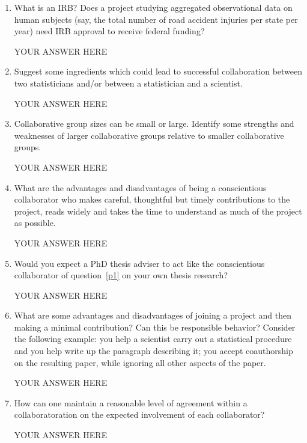 \documentclass[12pt]{article}
\begin{document}
\begin{enumerate}

\item What is an IRB? Does a project studying aggregated observational data on human subjects (say, the total number of road accident injuries per state per year) need IRB approval to receive federal funding?

YOUR ANSWER HERE

\item Suggest some ingredients which could lead to successful collaboration between two statisticians and/or between a statistician and a scientist.

YOUR ANSWER HERE

\item Collaborative group sizes can be small or large. Identify some strengths and weaknesses of larger collaborative groups relative to smaller collaborative groups.

YOUR ANSWER HERE
 
\item \label{p1} What are the advantages and disadvantages of being a conscientious collaborator who makes careful, thoughtful but timely contributions to the project, reads widely and takes the time to understand as much of the project as possible.

YOUR ANSWER HERE

\item Would you expect a PhD thesis adviser to act like the conscientious collaborator of question~\ref{p1} on your own thesis research? 

YOUR ANSWER HERE

\item What are some advantages and disadvantages of joining a project and then making a minimal contribution? Can this be responsible behavior? Consider the following example: you help a scientist carry out a statistical procedure and you help write up the paragraph describing it; you accept coauthorship on the resulting paper, while ignoring all other aspects of the paper.

YOUR ANSWER HERE

\item How can one maintain a reasonable level of agreement within a collaboratoration on the expected involvement of each collaborator?

YOUR ANSWER HERE

\end{enumerate}
\end{document}
